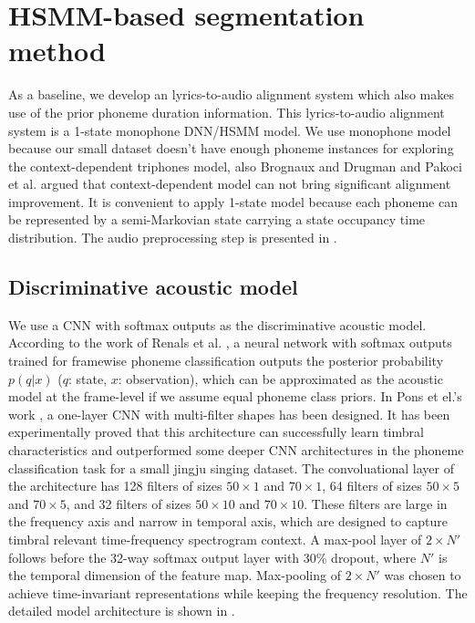\section{HSMM-based segmentation method}\label{sec:ch5:hsmm_segmentation}

As a baseline, we develop an lyrics-to-audio alignment system which also makes use of the prior phoneme duration information. This lyrics-to-audio alignment system is a 1-state monophone DNN/HSMM model. We use monophone model because our small dataset doesn't have enough phoneme instances for exploring the context-dependent triphones model, also Brognaux and Drugman \cite{brognaux2016hmm} and Pakoci et al. \cite{pakoci2016phonetic} argued that context-dependent model can not bring significant alignment improvement. It is convenient to apply 1-state model because each phoneme can be represented by a semi-Markovian state carrying a state occupancy time distribution. The audio preprocessing step is presented in .

\subsection{Discriminative acoustic model}

We use a CNN with softmax outputs as the discriminative acoustic model. According to the work of Renals et al. \cite{Renals1994Connectionist}, a neural network with softmax outputs trained for framewise phoneme classification outputs the posterior probability $p(q|x)$ ($q$: state, $x$: observation), which can be approximated as the acoustic model at the frame-level if we assume equal phoneme class priors. In Pons et el.'s work \cite{Pons2017Timbre}, a one-layer CNN with multi-filter shapes has been designed. It has been experimentally proved that this architecture can successfully learn timbral characteristics and outperformed some deeper CNN architectures in the phoneme classification task for a small jingju singing dataset. The convoluational layer of the architecture has 128 filters of sizes $50{\times}1$ and $70{\times}1$, 64 filters of sizes $50{\times}5$ and $70{\times}5$, and 32 filters of sizes $50{\times}10$ and $70{\times}10$. These filters are large in the frequency axis and narrow in temporal axis, which are designed to capture timbral relevant time-frequency spectrogram context. A max-pool layer of $2{\times}N'$ follows before the 32-way softmax output layer with 30\% dropout, where $N'$ is the temporal dimension of the feature map. Max-pooling of $2{\times}N'$ was chosen to achieve time-invariant representations
while keeping the frequency resolution. The detailed model architecture is shown in .

